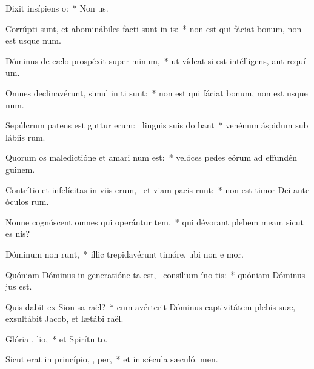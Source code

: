 \item Dixit insípiens   o:~* Non  us.
\item Corrúpti sunt, et abominábiles facti sunt in  is:~* non est qui fáciat bonum, non est usque  num.
\item Dóminus de cælo prospéxit super  minum,~* ut vídeat si est intélligens, aut requí um.
\item Omnes declinavérunt, simul in ti sunt:~* non est qui fáciat bonum, non est usque  num.
\item Sepúlcrum patens est guttur erum:~\pscross{} linguis suis do bant~* venénum áspidum sub lábiis rum.
\item Quorum os maledictióne et amari num est:~* velóces pedes eórum ad effundén guinem.
\item Contrítio et infelícitas in viis erum,~\pscross{} et viam pacis  runt:~* non est timor Dei ante óculos rum.
\item Nonne cognóscent omnes qui operántur tem,~* qui dévorant plebem meam sicut es nis?
\item Dóminum non runt,~* illic trepidavérunt timóre, ubi non e mor.
\item Quóniam Dóminus in generatióne ta est,~\pscross{} consílium íno tis:~* quóniam Dóminus  jus est.
\item Quis dabit ex Sion sa raël?~* cum avérterit Dóminus captivitátem plebis suæ, exsultábit Jacob, et lætábi raël.
\item Glória ,  lio,~* et Spirítu to.
\item Sicut erat in princípio,  ,  per,~* et in sǽcula sæculó. men.
